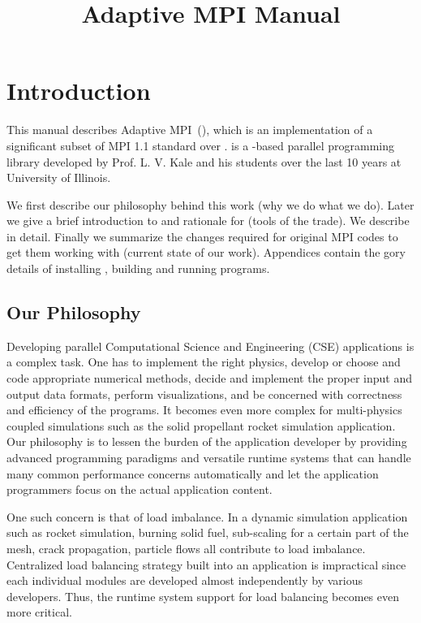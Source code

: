 \documentclass[10pt]{article}
\title{Adaptive MPI Manual}
\begin{document}
\maketitle

\section{Introduction}

This manual describes Adaptive MPI~(\ampi{}), which is an implementation of a
significant subset of MPI 1.1 standard over \charmpp{}. \charmpp{} is a
\CC{}-based parallel programming library developed by Prof. L. V. Kale and his
students over the last 10 years at University of Illinois.

We first describe our philosophy behind this work (why we do what we do).
Later we give a brief introduction to \charmpp{} and rationale for \ampi{}
(tools of the trade). We describe \ampi{} in detail. Finally we summarize the
changes required for original MPI codes to get them working with \ampi{}
(current state of our work). Appendices contain the gory details of installing
\ampi{}, building and running \ampi{} programs.

\subsection{Our Philosophy}

Developing parallel Computational Science and Engineering (CSE) applications is
a complex task. One has to implement the right physics, develop or choose and
code appropriate numerical methods, decide and implement the proper input and
output data formats, perform visualizations, and be concerned with correctness
and efficiency of the programs. It becomes even more complex for multi-physics
coupled simulations such as the solid propellant rocket simulation application.  
Our philosophy is to lessen the burden of the application developer by
providing advanced programming paradigms and versatile runtime systems that can
handle many common performance concerns automatically and let the application
programmers focus on the actual application content.

One such concern is that of load imbalance. In a dynamic simulation application
such as rocket simulation, burning  solid fuel, sub-scaling for a certain part
of the mesh, crack propagation, particle flows all contribute to load
imbalance. Centralized load balancing strategy built into an application is
impractical since each individual modules are developed almost independently by
various developers. Thus, the runtime system support for load balancing becomes
even more critical.
\end{document}
